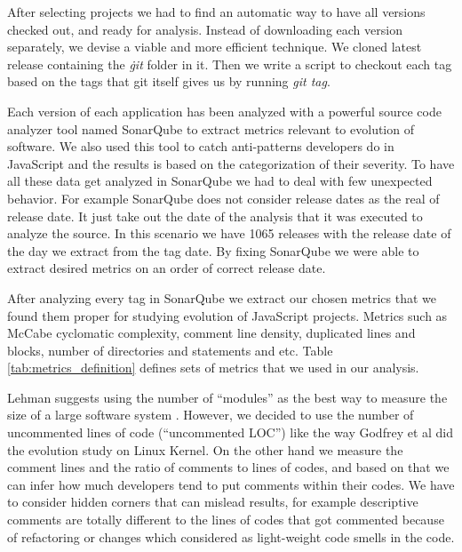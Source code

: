 After selecting projects we had to find an automatic way to have all versions checked out, and ready for analysis. Instead of downloading each version separately, we devise a viable and more efficient technique. We cloned latest release containing the \textit{\.git} folder in it. Then we write a script to checkout each tag based on the tags that git itself gives us by running \textit{git tag}.
\par
Each version of each application has been analyzed with a powerful source code analyzer tool named SonarQube to extract metrics relevant to evolution of software. We also used this tool to catch anti-patterns developers do in JavaScript and the results is based on the categorization of their severity.
To have all these data get analyzed in SonarQube we had to deal with few unexpected behavior. For example SonarQube does not consider release dates as the real of release date. It just take out the date of the analysis that it was executed to analyze the source. In this scenario we have 1065 releases with the release date of the day we extract from the tag date. By fixing SonarQube we were able to extract desired metrics on an order of correct release date.

\par After analyzing every tag in SonarQube we extract our chosen metrics that we found them proper for studying evolution of JavaScript projects. Metrics such as McCabe cyclomatic complexity,  comment line density, duplicated lines and blocks, number of directories and statements and etc. Table  \ref{tab:metrics_definition} defines sets of metrics that we used in our analysis.



\par
Lehman suggests using the number of “modules” as the best way to measure the size of a large software system \cite{Lehman1997METRICS}. However, we decided to use the number of uncommented lines of code (“uncommented LOC”) like the way Godfrey et al \cite{Godfrey2000ICMS} did the evolution study on Linux Kernel. On the other hand we measure the comment lines and the ratio of comments to lines of codes, and based on that we can infer how much developers tend to put comments within their codes. We have to consider hidden corners that can mislead results, for example descriptive comments are totally different to the lines of codes that got commented because of refactoring or changes which considered as light-weight code smells in the code.

